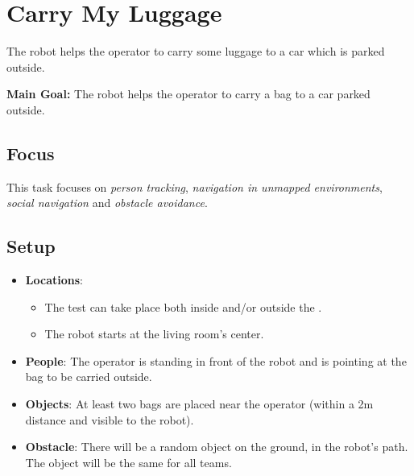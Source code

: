 \section{Carry My Luggage}
\label{test:carry-my-luggage}


The robot helps the operator to carry some luggage to a car which is parked outside.

\noindent \textbf{Main Goal:} The robot helps the operator to carry a bag to a car parked outside.\\


\subsection*{Focus}
This task focuses on \textit{person tracking}, \emph{navigation in unmapped environments}, \emph{social navigation} and \textit{obstacle avoidance}.

\subsection*{Setup}
\begin{itemize}[nosep]
	\item \textbf{Locations}: 
		\begin{itemize}
		 \item The test can take place both inside and/or outside the \Arena{}.
		 \item The robot starts at the living room's center.
		\end{itemize}
	\item \textbf{People}: The operator is standing in front of the robot and is pointing at the bag to be carried outside.
	\item \textbf{Objects}: At least two bags are placed near the operator (within a 2m distance and visible to the robot).
	\item \textbf{Obstacle}: There will be a random object on the ground, in the robot's path. The object will be the same for all teams.
\end{itemize}

